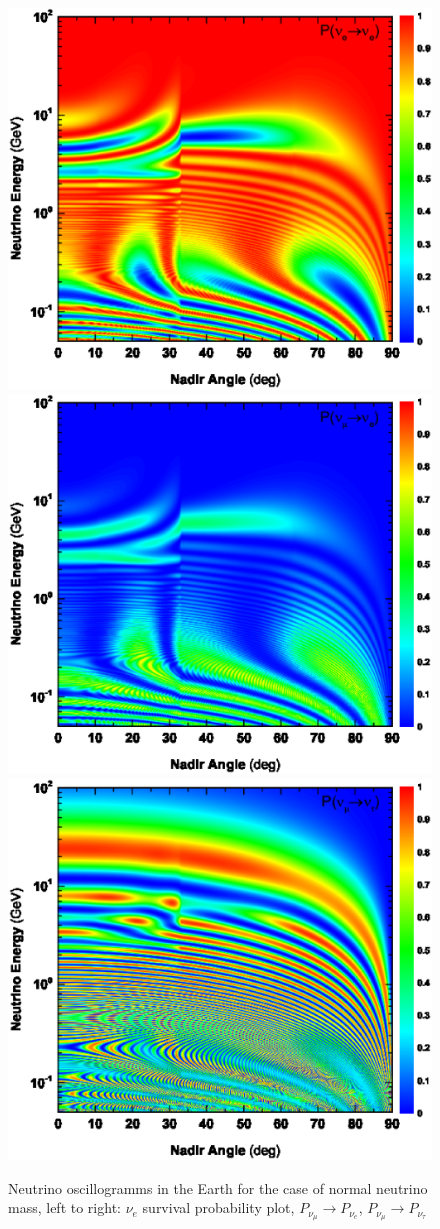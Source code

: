 \begin{figure}[htb!]
\begin{center}
\includegraphics[width=0.8\columnwidth]{./MSW/Pee-NH2.eps}
\includegraphics[width=0.8\columnwidth]{./MSW/Pme-NH2.eps}
\includegraphics[width=0.8\columnwidth]{./MSW/Pmt-NH2.eps}
\caption{\label{ogramms}Neutrino oscillogramms in the Earth for the case of normal neutrino mass, left to right: $\nu_{e}$ survival probability plot, $P_{\nu_{\mu}}\to{}P_{\nu_{e}}$, $P_{\nu_{\mu}}\to{}P_{\nu_{\tau}}$}
\end{center}
\end{figure}

